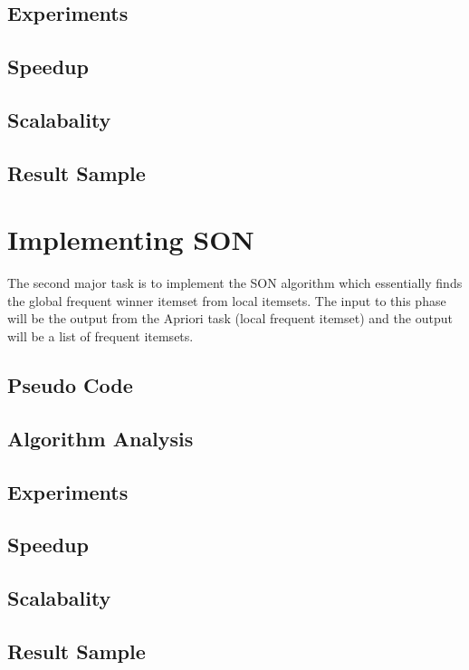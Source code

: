 \documentclass[11pt]{article}
\begin{document}
\subsection {Experiments}
\subsection {Speedup}
\subsection {Scalabality}
\subsection {Result Sample}
 
\section{Implementing SON}
The second major task is to implement the SON algorithm which essentially finds the global frequent winner itemset from local itemsets. The input to this phase will be the output from the Apriori task (local frequent itemset) and the output will be a list of frequent itemsets.\\
\subsection {Pseudo Code}
\subsection {Algorithm Analysis}
\subsection {Experiments}
\subsection {Speedup}
\subsection {Scalabality}
\subsection {Result Sample}
\end{document}
